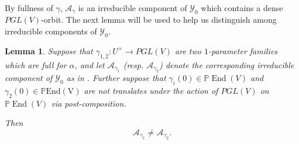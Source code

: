 \documentclass[12 pt, reqno]{amsart}
\newtheorem{lem}[thm]{Lemma}
\theoremstyle{definition}
\newcommand{\on}{\operatorname}
\newcommand{\mb}{\mathbb}
\renewcommand{\P}{\mb{P}}
\begin{document}

By fullness of $\gamma$, $\mathcal{A}_{\gamma}$ is an irreducible
component of $\mathcal{Y}_{0}$ which contains a dense
$PGL(V)$-orbit. The next lemma will be used to help us distinguish
among irreducible components of $\mathcal{Y}_{0}$.

\begin{lem}
  \label{gamma12}
  Suppose that $\gamma_{1,2}: U^{\times} \to PGL(V)$ are two
  $1$-parameter families which are full for $\alpha$, and let
  $\mathcal{A}_{\gamma_{1}}$ (resp. $\mathcal{A}_{\gamma_{2}}$) denote
  the corresponding irreducible component of $\mathcal{Y}_{0}$ as in
  .  Further suppose that
  $\gamma_{i}(0) \in \P \on{End}(V)$ and
  $\gamma_{2}(0) \in \P \on{End(V)}$ are not translates under the
  action of $PGL(V)$ on $\P \on{End}(V)$ via post-composition.

  Then
  \[\mathcal{A}_{\gamma_{1}} \neq \mathcal{A}_{\gamma_{2}}.\]
\end{lem}
\end{document}
